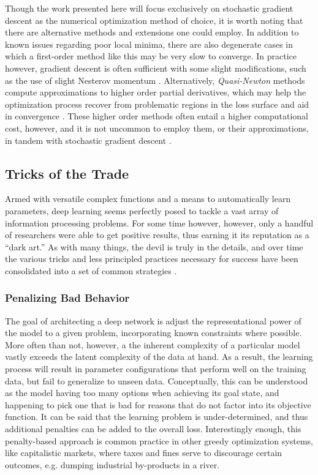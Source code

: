 Though the work presented here will focus exclusively on stochastic gradient descent as the numerical optimization method of choice, it is worth noting that there are alternative methods and extensions one could employ.
In addition to known issues regarding poor local minima, there are also degenerate cases in which a first-order method like this may be very slow to converge.
In practice however, gradient descent is often sufficient with some slight modifications, such as the use of slight Nesterov momentum \cite{Sutskever2013Importance}.
Alternatively, \emph{Quasi-Newton} methods compute approximations to higher order partial derivatives, which may help the optimization process recover from problematic regions in the loss surface and aid in convergence \cite{Liu1989Limited}.
These higher order methods often entail a higher computational cost, however, and it is not uncommon to employ them, or their approximations, in tandem with stochastic gradient descent \cite{Kavukcuoglu2010Learning}.


\subsection{Tricks of the Trade}
\label{subsec:tricks}

Armed with versatile complex functions and a means to automatically learn parameters, deep learning seems perfectly posed to tackle a vast array of information processing problems.
For some time however, however, only a handful of researchers were able to get positive results, thus earning it its reputation as a ``dark art.''
As with many things, the devil is truly in the details, and over time the various tricks and less principled practices necessary for success have been consolidated into a set of common strategies \cite{Bengio2012Practical}.

\subsubsection{Penalizing Bad Behavior}

The goal of architecting a deep network is adjust the representational power of the model to a given problem, incorporating known constraints where possible.
More often than not, however, a the inherent complexity of a particular model vastly exceeds the latent complexity of the data at hand.
As a result, the learning process will result in parameter configurations that perform well on the training data, but fail to generalize to unseen data.
Conceptually, this can be understood as the model having too many options when achieving its goal state, and happening to pick one that is bad for reasons that do not factor into its objective function.
It can be said that the learning problem is under-determined, and thus additional penalties can be added to the overall loss.
Interestingly enough, this penalty-based approach is common practice in other greedy optimization systems, like capitalistic markets, where taxes and fines serve to discourage certain outcomes, e.g. dumping industrial by-products in a river.

